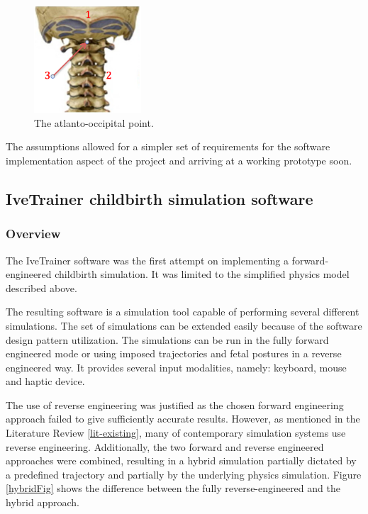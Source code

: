   \begin{figure}
  \begin{center}
  \includegraphics[width=40mm]{sections/methodology/images/basic/ao-point.png}
  \caption[The atlanto-occipital point.]{\label{basic-ao-point} The atlanto-occipital point.}
  \end{center}
  \end{figure}

  The assumptions allowed for a simpler set of requirements for the software implementation aspect of the project and arriving at a working prototype soon.


\subsection{IveTrainer childbirth simulation software}

\subsubsection{Overview}

The IveTrainer software was the first attempt on implementing a forward-engineered childbirth simulation. It was limited to the simplified physics model described above.

The resulting software is a simulation tool capable of performing several different simulations. The set of simulations can be extended easily because of the software design pattern utilization. The simulations can be run in the fully forward engineered mode or using imposed trajectories and fetal postures in a reverse engineered way. It provides several input modalities, namely: keyboard, mouse and haptic device.

The use of reverse engineering was justified as the chosen forward engineering approach failed to give sufficiently accurate results. However, as mentioned in the Literature Review \ref{lit-existing}, many of contemporary simulation systems use reverse engineering. Additionally, the two forward and reverse engineered approaches were combined, resulting in a hybrid simulation partially dictated by a predefined trajectory and partially by the underlying physics simulation. Figure \ref{hybridFig} shows the difference between the fully reverse-engineered and the hybrid approach.

